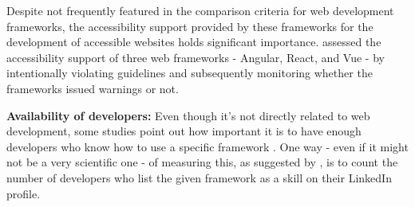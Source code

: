 Despite not frequently featured in the comparison criteria for web development frameworks, the accessibility support provided by these frameworks for the development of accessible websites holds significant importance. \cite{Longley.2021} assessed the accessibility support of three web frameworks - Angular, React, and Vue - by intentionally violating guidelines and subsequently monitoring whether the frameworks issued warnings or not.

\textbf{Availability of developers:}
Even though it's not directly related to web development, some studies point out how important it is to have enough developers who know how to use a specific framework \cite{Neuhaus.2017, M.Kaluza.2019, Kumar.2018 }. One way - even if it might not be a very scientific one - of measuring this, as suggested by \cite{M.Kaluza.2019}, is to count the number of developers who list the given framework as a skill on their LinkedIn profile.


